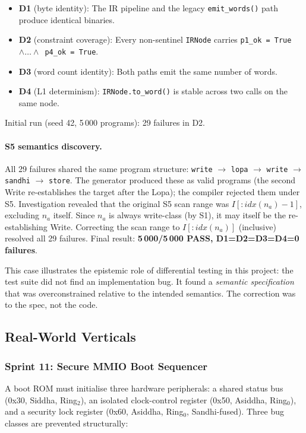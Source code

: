 \documentclass[11pt,a4paper]{article}
\begin{document}
\begin{itemize}
\item \textbf{D1} (byte identity): The IR pipeline and the legacy
  \texttt{emit\_words()} path produce identical binaries.
\item \textbf{D2} (constraint coverage): Every non-sentinel \texttt{IRNode}
  carries \texttt{p1\_ok = True}~$\wedge \ldots \wedge$~\texttt{p4\_ok = True}.
\item \textbf{D3} (word count identity): Both paths emit the same number of
  words.
\item \textbf{D4} (L1 determinism): \texttt{IRNode.to\_word()} is stable
  across two calls on the same node.
\end{itemize}

Initial run (seed 42, 5\,000 programs): 29 failures in D2.

\paragraph{S5 semantics discovery.}
All 29 failures shared the same program structure: \texttt{write} $\to$
\texttt{lopa} $\to$ \texttt{write} $\to$ \texttt{sandhi} $\to$
\texttt{store}. The generator produced these as valid programs (the second
Write re-establishes the target after the Lopa); the compiler rejected them
under S5. Investigation revealed that the original S5 scan range was
$I[:\mathit{idx}(n_a)-1]$, excluding $n_a$ itself. Since $n_a$ is always
write-class (by S1), it may itself be the re-establishing Write. Correcting
the scan range to $I[:\mathit{idx}(n_a)]$ (inclusive) resolved all 29
failures. Final result: \textbf{5\,000/5\,000 PASS, D1=D2=D3=D4=0 failures}.

This case illustrates the epistemic role of differential testing in this
project: the test suite did not find an implementation bug. It found a
\emph{semantic specification} that was overconstrained relative to the
intended semantics. The correction was to the spec, not the code.

\subsection{Real-World Verticals}

\subsubsection{Sprint 11: Secure MMIO Boot Sequencer}

A boot ROM must initialise three hardware peripherals: a shared status bus
(0x30, Siddha, Ring$_2$), an isolated clock-control register (0x50, Asiddha,
Ring$_0$), and a security lock register (0x60, Asiddha, Ring$_0$,
Sandhi-fused). Three bug classes are prevented structurally:
\end{document}
